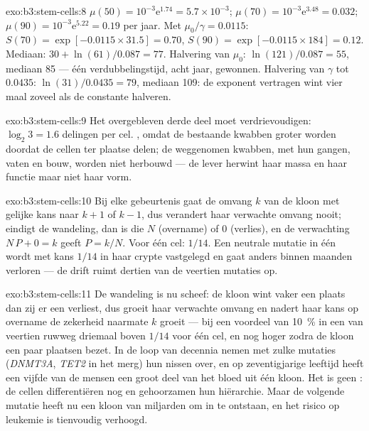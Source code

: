\begin{solution}{exo:b3:stem-cells:8}
$\mu(50) = 10^{-3}\mathrm{e}^{1.74} = 5.7\times 10^{-3}$; $\mu(70) =
10^{-3}\mathrm{e}^{3.48} = 0.032$; $\mu(90) = 10^{-3}\mathrm{e}^{5.22} =
0.19$ per jaar. Met $\mu_{0}/\gamma = 0.0115$: $S(70) = \exp[-0.0115
\times 31.5] = 0.70$, $S(90) = \exp[-0.0115\times 184] = 0.12$.
Mediaan: $30 + \ln(61)/0.087 = 77$. Halvering van $\mu_{0}$:
$\ln(121)/0.087 = 55$, mediaan 85 --- één verdubbelingstijd, acht jaar,
gewonnen. Halvering van $\gamma$ tot $0.0435$: $\ln(31)/0.0435 = 79$,
mediaan 109: de exponent vertragen wint vier maal zoveel als de
constante halveren.
\end{solution}

\begin{solution}{exo:b3:stem-cells:9}
Het overgebleven derde deel moet verdrievoudigen: $\log_{2}3 = 1.6$
delingen per cel. , omdat de bestaande kwabben
groter worden doordat de cellen ter plaatse delen; de weggenomen
kwabben, met hun gangen, vaten en bouw, worden niet herbouwd --- de
lever herwint haar massa en haar functie maar niet haar vorm.
\end{solution}

\begin{solution}{exo:b3:stem-cells:10}
Bij elke gebeurtenis gaat de omvang $k$ van de kloon met gelijke kans
naar $k + 1$ of $k - 1$, dus verandert haar verwachte omvang nooit;
eindigt de wandeling, dan is die $N$ (overname) of $0$ (verlies), en de
verwachting $N\,P + 0 = k$ geeft $P = k/N$. Voor één cel: $1/14$. Een
neutrale mutatie in één  wordt met kans $1/14$ in haar crypte
vastgelegd en gaat anders binnen maanden verloren --- de drift ruimt
dertien van de veertien mutaties op.
\end{solution}

\begin{solution}{exo:b3:stem-cells:11}
De wandeling is nu scheef: de kloon wint vaker een plaats dan zij er
een verliest, dus groeit haar verwachte omvang en nadert haar kans op
overname de zekerheid naarmate $k$ groeit --- bij een voordeel van
\qty{10}{\%} in een  van veertien ruwweg driemaal boven $1/14$ voor
één cel, en nog hoger zodra de kloon een paar plaatsen bezet. In de
loop van decennia nemen  met zulke mutaties (\emph{DNMT3A},
\emph{TET2} in het merg) hun nissen over, en op zeventigjarige leeftijd
heeft een vijfde van de mensen een groot deel van het bloed uit één
kloon. Het is geen : de cellen differentiëren nog en
gehoorzamen hun hiërarchie. Maar de volgende mutatie heeft nu een kloon
van miljarden om in te ontstaan, en het risico op leukemie is
tienvoudig verhoogd.
\end{solution}

